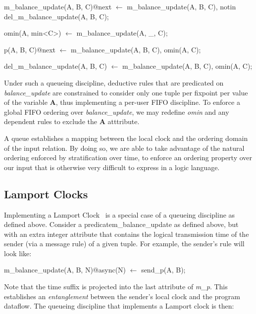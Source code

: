\begin{Dedalus}

m\_balance\_update(A, B, C)@next \(\leftarrow\)
  m\_balance\_update(A, B, C),
  notin del\_m\_balance\_update(A, B, C);

omin(A, min<C>) \(\leftarrow\)
  m\_balance_update(A, _, C);

p(A, B, C)@next \(\leftarrow\)
  m\_balance\_update(A, B, C),
  omin(A, C);

del\_m\_balance\_update(A, B, C) \(\leftarrow\)
  m\_balance\_update(A, B, C),
  omin(A, C);
\end{Dedalus}

Under such a queueing discipline, deductive rules that are predicated on \emph{balance\_update} are constrained to consider only one tuple per fixpoint
per value of the variable \textbf{A}, thus implementing a per-user FIFO discipline.  To enforce a global FIFO ordering over \emph{balance\_update}, 
we may redefine \emph{omin} and any dependent rules to exclude the \textbf{A} atttribute.

A queue establishes a mapping between the local clock and the ordering domain of the input relation. By doing so, we are able to take
advantage of the natural ordering enforced by stratification over time, to enforce an ordering property over our input that is otherwise 
very difficult to express in a logic language.

\subsection{Lamport Clocks}

Implementing a Lamport Clock~\cite{timeclocks} is a special case of a queueing discipline as defined above.
Consider a predicate{m\_balance\_update} as defined above, but with an extra integer attribute that contains the logical transmission
time of the sender (via a message rule) of a given tuple.  For example, the sender's rule will look like: 


\begin{Dedalus}
m\_balance\_update(A, B, N)@async(N) \(\leftarrow\)
  send\_p(A, B);
\end{Dedalus}

Note that the time suffix is projected into the last attribute of \emph{m\_p}.  This establishes an \emph{entanglement} between
the sender's local clock and the program dataflow.  The queueing discipline that implements a
Lamport clock is then:

